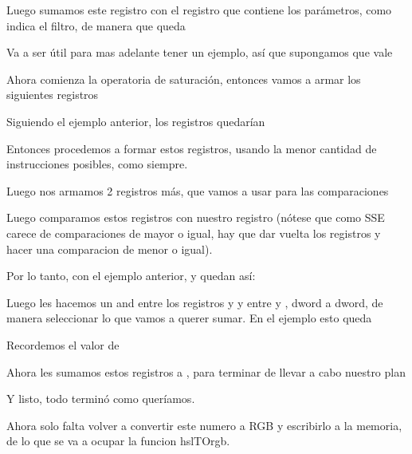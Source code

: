 
Luego sumamos este registro con el registro que contiene los parámetros, como indica el filtro, de manera que queda


Va a ser útil para mas adelante tener un ejemplo, así que supongamos que  vale



Ahora comienza la operatoria de saturación, entonces vamos a armar los siguientes registros



Siguiendo el ejemplo anterior, los registros quedarían





Entonces procedemos a formar estos registros, usando la menor cantidad de instrucciones posibles, como siempre.

Luego nos armamos 2 registros más, que vamos a usar para las comparaciones




Luego comparamos estos registros con nuestro registro  (nótese que como SSE carece de comparaciones de mayor o igual, hay que dar vuelta los registros y hacer una comparacion de menor o igual).

Por lo tanto, con el ejemplo anterior,  y  quedan así:




Luego les hacemos un and entre los registros  y  y entre  y , dword a dword, de manera seleccionar lo que vamos a querer sumar. En el ejemplo esto queda




Recordemos el valor de 



Ahora les sumamos estos registros a , para terminar de llevar a cabo nuestro plan


Y listo, todo terminó como queríamos.

Ahora solo falta volver a convertir este numero a RGB y escribirlo a la memoria, de lo que se va a ocupar la funcion hslTOrgb.


